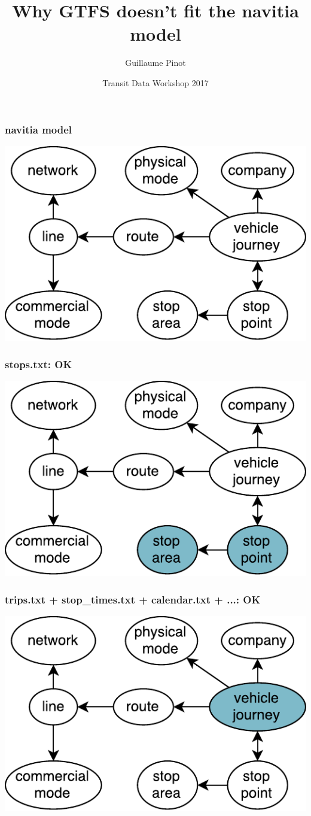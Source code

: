 \documentclass[table]{beamer}
\title{Why GTFS doesn't fit the navitia model}
\author{Guillaume Pinot}
\institute[Kisio Digital] %
{
  Kisio Digital\\
  20 rue Hector Malot\\
  75012 Paris, France}
\date{Transit Data Workshop 2017}
\begin{document}
\begin{frame}
  \titlepage
\end{frame}

\begin{frame}
  \frametitle{navitia model}

  \centering\includegraphics[width=0.9\linewidth]{images/navitia-model}
\end{frame}

\begin{frame}
  \frametitle{stops.txt: OK}

  \centering\includegraphics[width=0.9\linewidth]{images/navitia-model-stops}
\end{frame}

\begin{frame}
  \frametitle{trips.txt + stop\_times.txt + calendar.txt + ...: OK}

  \centering\includegraphics[width=0.9\linewidth]{images/navitia-model-trips}
\end{frame}
\end{document}
